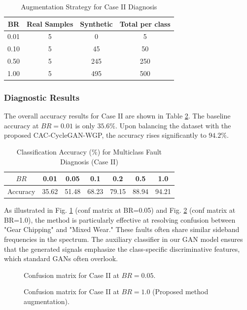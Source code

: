 \begin{table}[htbp]
\centering
\caption{Augmentation Strategy for Case II Diagnosis}
\label{tab:aug_case2}
\begin{tabular}{cccc}
\hline
\textbf{BR} & \textbf{Real Samples} & \textbf{Synthetic} & \textbf{Total per class} \\ \hline
0.01 & 5 & 0 & 5 \\
0.10 & 5 & 45 & 50 \\
0.50 & 5 & 245 & 250 \\
1.00 & 5 & 495 & 500 \\
\hline
\end{tabular}
\end{table}

\subsubsection{Diagnostic Results}
The overall accuracy results for Case II are shown in Table \ref{tab:acc_case2}. The baseline accuracy at $BR=0.01$ is only $35.6\%$. Upon balancing the dataset with the proposed CAC-CycleGAN-WGP, the accuracy rises significantly to $94.2\%$. 

\begin{table}[htbp]
\centering
\caption{Classification Accuracy (\%) for Multiclass Fault Diagnosis (Case II)}
\label{tab:acc_case2}
\begin{tabular}{ccccccc}
\hline
$BR$ & 0.01 & 0.05 & 0.1 & 0.2 & 0.5 & 1.0 \\ \hline
Accuracy & 35.62 & 51.48 & 68.23 & 79.15 & 88.94 & 94.21 \\
\hline
\end{tabular}
\end{table}

As illustrated in Fig. \ref{fig:conf_case2_1} (conf matrix at BR=0.05) and Fig. \ref{fig:conf_case2_2} (conf matrix at BR=1.0), the method is particularly effective at resolving confusion between "Gear Chipping" and "Mixed Wear." These faults often share similar sideband frequencies in the spectrum. The auxiliary classifier in our GAN model ensures that the generated signals emphasize the class-specific discriminative features, which standard GANs often overlook.

\begin{figure}[htbp]
\centering
\caption{Confusion matrix for Case II at $BR=0.05$.}
\label{fig:conf_case2_1}
\end{figure}

\begin{figure}[htbp]
\centering
\caption{Confusion matrix for Case II at $BR=1.0$ (Proposed method augmentation).}
\label{fig:conf_case2_2}
\end{figure}

